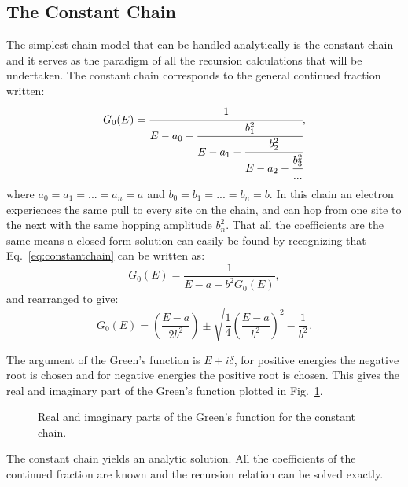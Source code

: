 \subsection{The Constant Chain}
The simplest chain model that can be handled analytically is the constant chain and it
serves as the paradigm of all the recursion calculations that will be undertaken. 
The constant chain corresponds to the general continued fraction written:
%
\begin{equation}
\label{eq:constantchain}
G_{0}(E) = \cfrac{1}{E-a_{0}-\cfrac{b_{1}^2}{E-a_{1}-\cfrac{b_{2}^{2}}{E-a_{2}-\cfrac{b_{3}^{2}}{...}}}},
\end{equation}
%
where $a_{0}=a_{1}=...=a_{n}=a$ and $b_{0}=b_{1}=...=b_{n}=b$. 
%
In this chain an electron experiences the same pull to 
every site on the chain, and can hop from one site to 
the next with the same hopping amplitude $b^{2}_{n}$. 
%
That all the coefficients are the same means a closed 
form solution can easily be found by recognizing that 
Eq.~\ref{eq:constantchain} can be written as:
%
\begin{equation}
G_{0}(E) = \frac{1}{E-a-b^{2}G_{0}(E)},
\end{equation}
%
and rearranged to give:
%
\begin{equation}
G_{0}(E) = (\frac{E-a}{2b^{2}}) \pm \sqrt{\frac{1}{4}(\frac{E-a}{b^{2}})^{2} - \frac{1}{b^{2}}}.
\end{equation}

The argument of the Green's function is $E + i\delta$, for positive 
energies the negative root is chosen and for negative energies 
the positive root is chosen. This gives the real
and imaginary part of the Green's function plotted 
in Fig.~\ref{fig:gfconstchain}.
%
\begin{figure}
\begin{center}
{\graphicspath{{./invariance/chain_figs/}}}
\caption{Real and imaginary parts of the Green's function for the constant chain.\label{fig:gfconstchain}}
\end{center}
\end{figure}
%
The constant chain yields an analytic solution. All the coefficients of the continued
fraction are known and the recursion relation can be solved exactly. 


